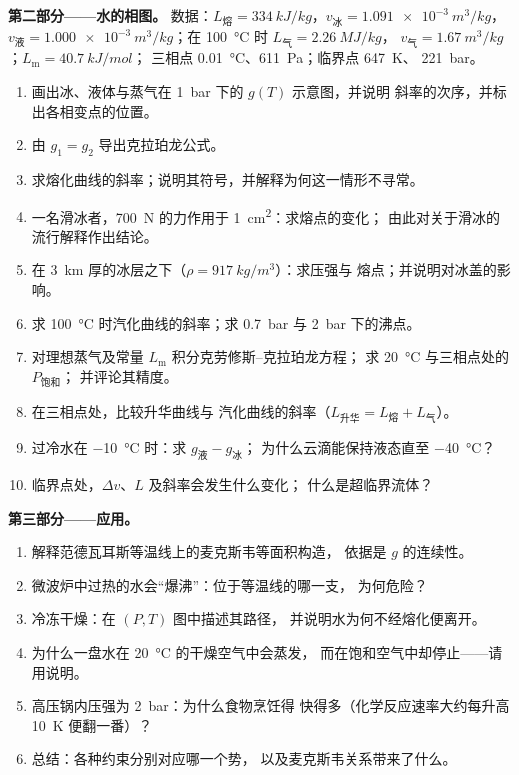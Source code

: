 \begin{problem}
\textbf{第二部分——水的相图。}
数据：$L_{\text{熔}} = \qty{334}{kJ/kg}$，$v_{\text{冰}} = \qty{1.091e-3}{m^3/kg}$，
$v_{\text{液}} = \qty{1.000e-3}{m^3/kg}$；在 \qty{100}{\celsius} 时 $L_{\text{气}} = \qty{2.26}{MJ/kg}$，
$v_{\text{气}} = \qty{1.67}{m^3/kg}$；$L_{\text{m}} = \qty{40.7}{kJ/mol}$；
三相点 \qty{0.01}{\celsius}、\qty{611}{Pa}；临界点 \qty{647}{K}、
\qty{221}{bar}。
\begin{enumerate}[resume]
  \item 画出冰、液体与蒸气在 \qty{1}{bar} 下的 $g(T)$ 示意图，并说明
        斜率的次序，并标出各相变点的位置。
  \item 由 $g_1 = g_2$ 导出克拉珀龙公式。
  \item 求熔化曲线的斜率；说明其符号，并解释为何这一情形不寻常。
  \item 一名滑冰者，\qty{700}{N} 的力作用于 \qty{1}{cm^2}：求熔点的变化；
        由此对关于滑冰的流行解释作出结论。
  \item 在 \qty{3}{km} 厚的冰层之下（$\rho = \qty{917}{kg/m^3}$）：求压强与
        熔点；并说明对冰盖的影响。
  \item 求 \qty{100}{\celsius} 时汽化曲线的斜率；求
        \qty{0.7}{bar} 与 \qty{2}{bar} 下的沸点。
  \item 对理想蒸气及常量 $L_{\text{m}}$ 积分克劳修斯–克拉珀龙方程；
        求 \qty{20}{\celsius} 与三相点处的 $P_{\text{饱和}}$；
        并评论其精度。
  \item 在三相点处，比较升华曲线与
        汽化曲线的斜率（$L_{\text{升华}} = L_{\text{熔}} + L_{\text{气}}$）。
  \item 过冷水在 \qty{-10}{\celsius} 时：求 $g_{\text{液}} - g_{\text{冰}}$；
        为什么云滴能保持液态直至 \qty{-40}{\celsius}？
  \item 临界点处，$\Delta v$、$L$ 及斜率会发生什么变化；
        什么是超临界流体？
\end{enumerate}

\textbf{第三部分——应用。}
\begin{enumerate}[resume]
  \item 解释范德瓦耳斯等温线上的麦克斯韦等面积构造，
        依据是 $g$ 的连续性。
  \item 微波炉中过热的水会“爆沸”：位于等温线的哪一支，
        为何危险？
  \item 冷冻干燥：在 $(P,T)$ 图中描述其路径，
        并说明水为何不经熔化便离开。
  \item 为什么一盘水在 \qty{20}{\celsius} 的干燥空气中会蒸发，
        而在饱和空气中却停止——请用说明。
  \item 高压锅内压强为 \qty{2}{bar}：为什么食物烹饪得
        快得多（化学反应速率大约每升高
        \qty{10}{K} 便翻一番）？
  \item 总结：各种约束分别对应哪一个势，
        以及麦克斯韦关系带来了什么。
\end{enumerate}
\end{problem}
